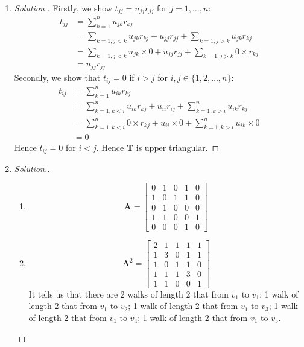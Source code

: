 \begin{enumerate}
\begin{proof}[Solution]
\begin{enumerate}
\[\begin{bmatrix}
\end{bmatrix} = \begin{bmatrix}
2&-4\\-3&6
\end{bmatrix}.
\]
\end{enumerate}
\end{proof}
\item
\begin{proof}[Solution.]
Firstly, we show $t_{jj}=u_{jj}r_{jj}$ for $j=1,\dots,n$:
\[
\begin{split}
t_{jj} &= \sum_{k=1}^{n}u_{jk}r_{kj}\\
&=\sum_{k=1,j<k}u_{jk}r_{kj} + u_{jj}r_{jj} + \sum_{k=1,j>k}u_{jk}r_{kj}\\
&=\sum_{k=1,j<k}u_{jk}\times0 + u_{jj}r_{jj} + \sum_{k=1,j>k}0\times r_{kj}\\
&=u_{jj}r_{jj}
\end{split}
\]
Secondly, we show that $t_{ij} = 0$ if $i>j$ for $i,j\in \{1,2,\dots,n\}:$
\[
\begin{split}
t_{ij}&=\sum_{k=1}^{n}u_{ik}r_{kj}\\
&=\sum_{k=1,k<i}^{n}u_{ik}r_{kj}+u_{ii}r_{ij}+\sum_{k=1,k>i}^{n}u_{ik}r_{kj}\\
&=\sum_{k=1,k<i}^{n}0\times r_{kj}+u_{ii}\times 0+\sum_{k=1,k>i}^{n}u_{ik}\times 0\\
&=0
\end{split}
\]
Hence $t_{ij} = 0$ for $i<j$. Hence $\bm T$ is upper triangular.
\end{proof}
\item
\begin{proof}[Solution.]
\begin{enumerate}
\item
\[\bm A = \begin{bmatrix}
0&1&0&1&0\\1&0&1&1&0\\0&1&0&0&0\\1&1&0&0&1\\0&0&0&1&0
\end{bmatrix}\]
\item
\[\bm A^{2} = \begin{bmatrix}
2&1&1&1&1\\1&3&0&1&1\\1&0&1&1&0\\1&1&1&3&0\\1&1&0&0&1
\end{bmatrix}\]
It tells us that there are 2 walks of length 2 that from $v_1$ to $v_1$; 1 walk of length 2 that from $v_1$ to $v_2$; 1 walk of length 2 that from $v_1$ to $v_3$; 1 walk of length 2 that from $v_1$ to $v_4$; 1 walk of length 2 that from $v_1$ to $v_5$.

\end{enumerate}
\end{proof}
\end{enumerate}
